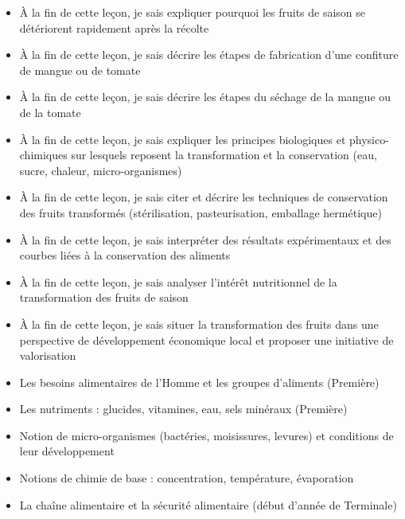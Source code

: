 \documentclass[11pt]{article}
\begin{document}
\begin{objectifs}
\begin{itemize}
\item À la fin de cette leçon, je sais expliquer pourquoi les fruits de saison se détériorent rapidement après la récolte
\item À la fin de cette leçon, je sais décrire les étapes de fabrication d'une confiture de mangue ou de tomate
\item À la fin de cette leçon, je sais décrire les étapes du séchage de la mangue ou de la tomate
\item À la fin de cette leçon, je sais expliquer les principes biologiques et physico-chimiques sur lesquels reposent la transformation et la conservation (eau, sucre, chaleur, micro-organismes)
\item À la fin de cette leçon, je sais citer et décrire les techniques de conservation des fruits transformés (stérilisation, pasteurisation, emballage hermétique)
\item À la fin de cette leçon, je sais interpréter des résultats expérimentaux et des courbes liées à la conservation des aliments
\item À la fin de cette leçon, je sais analyser l'intérêt nutritionnel de la transformation des fruits de saison
\item À la fin de cette leçon, je sais situer la transformation des fruits dans une perspective de développement économique local et proposer une initiative de valorisation
\end{itemize}
\end{objectifs}

\begin{prerequis}
\begin{itemize}
\item Les besoins alimentaires de l'Homme et les groupes d'aliments (Première)
\item Les nutriments : glucides, vitamines, eau, sels minéraux (Première)
\item Notion de micro-organismes (bactéries, moisissures, levures) et conditions de leur développement
\item Notions de chimie de base : concentration, température, évaporation
\item La chaîne alimentaire et la sécurité alimentaire (début d'année de Terminale)
\end{itemize}
\end{prerequis}

\newpage
\end{document}
